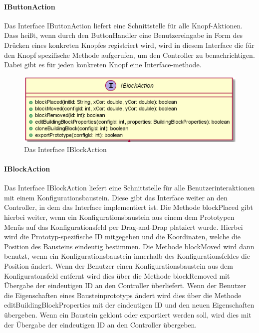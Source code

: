 \documentclass[parskip=full]{scrartcl}
\begin{document}
\paragraph{IButtonAction}

Das Interface IButtonAction liefert eine Schnittstelle für alle Knopf-Aktionen. Dass heißt, wenn durch den ButtonHandler eine Benutzereingabe in Form des Drücken eines konkreten Knopfes registriert wird, wird in diesem Interface die für den Knopf spezifische Methode aufgerufen, um den Controller zu benachrichtigen. Dabei gibt es für jeden konkreten Knopf eine Interface-methode.

\begin{figure}[htbp]
	\begin{center}
		\includegraphics[width = 10 cm]{Grafiken/View/IBlockAction.png}
		\caption{Das Interface IBlockAction}
		\label{IBlockAction}
	\end{center}
\end{figure}

\paragraph{IBlockAction}

Das Interface IBlockAction liefert eine Schnittstelle für alle Benutzerinteraktionen mit einem Konfigurationsbaustein. Diese gibt das Interface weiter an den Controller, in dem das Interface implementiert ist. Die Methode blockPlaced gibt hierbei weiter, wenn ein Konfigurationsbaustein aus einem dem Prototypen Menüs auf das Konfigurationsfeld per Drag-and-Drap platziert wurde. Hierbei wird die Prototyp-spezifische ID mitgegeben und die Koordinaten, welche die Position des Bausteins eindeutig bestimmen. Die Methode blockMoved wird dann benutzt, wenn ein Konfigurationsbaustein innerhalb des Konfigurationsfeldes die Position ändert. Wenn der Benutzer einen Konfigurationsbaustein aus dem Konfiguratonsfeld entfernt wird dies über die Methode blockRemoved mit Übergabe der eindeutigen ID an den Controller überliefert. Wenn der Benutzer die Eigenschaften eines Bausteinprototyps ändert wird dies über die Methode editBuildingBlockProperties mit der eindeutigen ID und den neuen Eigenschaften übergeben. Wenn ein Baustein geklont oder exportiert werden soll, wird dies mit der Übergabe der eindeutigen ID an den Controller übergeben.
\end{document}
